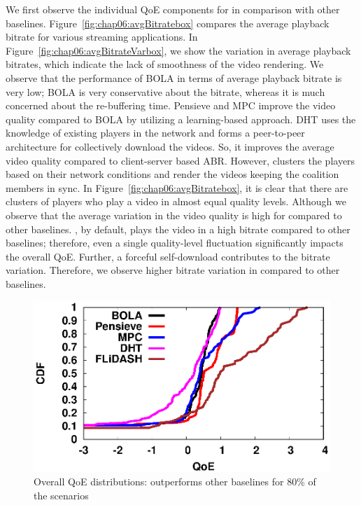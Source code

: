 We first observe the individual QoE components for {\our} in comparison with other baselines. Figure~\ref{fig:chap06:avgBitratebox} compares the average playback bitrate for various streaming applications. In Figure~\ref{fig:chap06:avgBitrateVarbox}, we show the variation in average playback bitrates, which indicate the lack of smoothness of the video rendering. We observe that the performance of BOLA in terms of average playback bitrate is very low; BOLA is very conservative about the bitrate, whereas it is much concerned about the re-buffering time. Pensieve and MPC improve the video quality compared to BOLA by utilizing a learning-based approach. DHT uses the knowledge of existing players in the network and forms a peer-to-peer architecture for collectively download the videos. So, it improves the average video quality compared to client-server based ABR. However, {\our} clusters the players based on their network conditions and render the videos keeping the coalition members in sync. In Figure~\ref{fig:chap06:avgBitratebox}, it is clear that there are clusters of players who play a video in almost equal quality levels. Although we observe that the average variation in the video quality is high for {\our} compared to other baselines. {\our}, by default, plays the video in a high bitrate compared to other baselines; therefore, even a single quality-level fluctuation significantly impacts the overall QoE. Further, a forceful self-download contributes to the bitrate variation. Therefore, we observe higher bitrate variation in {\our} compared to other baselines.  
\begin{figure}[!ht]
	\begin{center}
       			\includegraphics[width=0.7\linewidth]{img/grpbasic/qoe_cdf_1}
	\end{center}
	\caption{\label{fig:chap06:QoE} Overall QoE distributions: {\our} outperforms other baselines for $80\%$ of the scenarios}
\end{figure}


